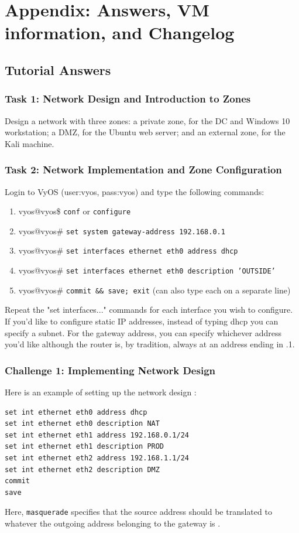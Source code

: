 \documentclass[12pt]{article}
\begin{document}
\pagebreak
\section{Appendix: Answers, VM information, and Changelog}
\subsection*{Tutorial Answers}
\subsubsection*{Task 1: Network Design and Introduction to Zones}
\par Design a network with three zones: a private zone, for the DC and Windows 10 workstation; a DMZ, for the Ubuntu web server; and an external zone, for the Kali machine.

\subsubsection*{Task 2: Network Implementation and Zone Configuration}
Login to VyOS (user:vyos, pass:vyos) and type the following commands:

\begin{enumerate}
\item vyos@vyos\$ \texttt{conf} or \texttt{configure}
\item vyos@vyos\# \texttt{set system gateway-address 192.168.0.1} 
\item vyos@vyos\# \texttt{set interfaces ethernet eth0 address dhcp}
\item vyos@vyos\# \texttt{set interfaces ethernet eth0 description 'OUTSIDE'}
\item vyos@vyos\# \texttt{commit \&\& save; exit} (can also type each on a separate line)
\end{enumerate}
Repeat the "set interfaces..." commands for each interface you wish to configure. If you'd like to configure static IP addresses, instead of typing dhcp you can specify a subnet. For the gateway address, you can specify whichever address you'd like although the router is, by tradition, always at an address ending in .1.

\subsubsection*{Challenge 1: Implementing Network Design}
Here is an example of setting up the network design \cite{vyoswiki}:
\begin{lstlisting}
set int ethernet eth0 address dhcp
set int ethernet eth0 description NAT
set int ethernet eth1 address 192.168.0.1/24
set int ethernet eth1 description PROD
set int ethernet eth2 address 192.168.1.1/24
set int ethernet eth2 description DMZ
commit
save
\end{lstlisting}
Here, \texttt{masquerade} specifies that the source address should be translated to whatever the outgoing address belonging to the gateway is \cite{vyoswiki}.
\end{document}
